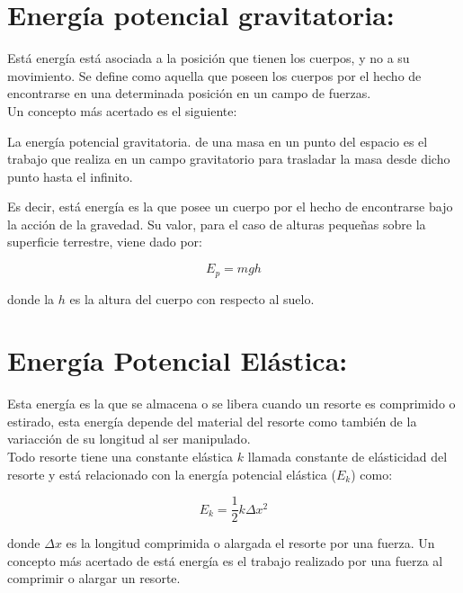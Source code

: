 \documentclass[a5paper,pagesize,10pt,bibtotoc,pointlessnumbers,
normalheadings,DIV=9,fleqn,x11names,table,twoside=false]{scrbook}
\begin{document}
\section{Energía potencial gravitatoria:}

Está energía está asociada a la posición que tienen los cuerpos, y no a su movimiento. Se define como aquella que poseen los 
cuerpos por el hecho de encontrarse en una determinada posición en un campo de fuerzas.\\

Un concepto más acertado es el siguiente:

\begin{tcolorbox}
La energía potencial gravitatoria. de una masa en un punto del espacio es el trabajo que realiza en un campo gravitatorio para 
trasladar la masa desde dicho punto hasta el infinito. 
\end{tcolorbox}

Es decir, está energía es la que posee un cuerpo por el hecho de encontrarse bajo la acción de la gravedad. Su valor, para el caso 
de alturas pequeñas sobre la superficie terrestre, viene dado por:

\begin{equation}
E_p = mgh
\end{equation}

donde la $h$ es la altura del cuerpo con respecto al suelo.

\section{Energía Potencial Elástica:}

Esta energía es la que se almacena o se libera cuando un resorte es comprimido o estirado, esta energía depende del material del 
resorte como también de la variacción de su longitud al ser manipulado.\\

Todo resorte tiene una constante elástica $k$ llamada constante de elásticidad del resorte y está relacionado con la energía 
potencial elástica ($E_k$) como:

\begin{equation}
E_k = \frac{1}{2}k\Delta x^2
\end{equation}

donde $\Delta x$ es la longitud comprimida o alargada el resorte por una fuerza. Un concepto más acertado de está energía es el 
trabajo realizado por una fuerza al comprimir o alargar un resorte.
\end{document}
